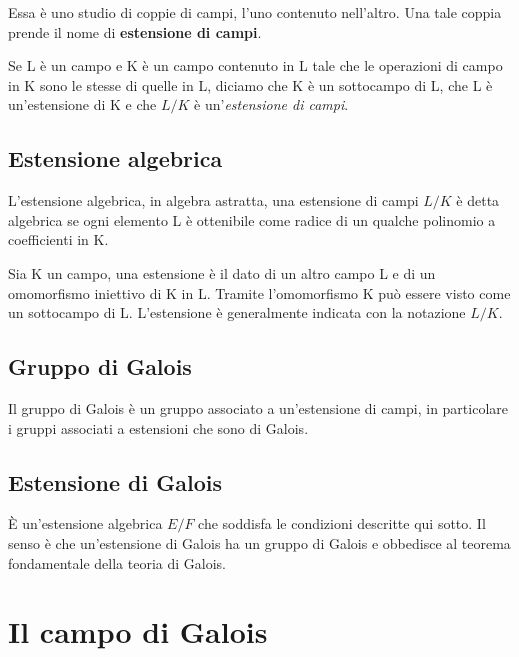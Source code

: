\textsf{\small Essa è uno studio di coppie di campi, l'uno contenuto nell'altro. Una tale coppia prende il nome di \textbf{estensione di campi}. }

\textsf{\small Se L è un campo e K è un campo contenuto in L tale che le operazioni di campo in K sono le stesse di quelle in L, diciamo che K è un sottocampo di L, che L è un'estensione di K e che $L/K$ è un'\emph{estensione di campi}.} %


\subsection{Estensione algebrica} %

\textsf{\small L'estensione algebrica, in algebra astratta, una estensione di campi $L/K$ è detta algebrica se ogni elemento L è ottenibile come radice di un qualche polinomio a coefficienti in K.}

\textsf{\small Sia K un campo, una estensione è il dato di un altro campo L e di un omomorfismo iniettivo di K in L. Tramite l'omomorfismo K può essere visto come un sottocampo di L. L'estensione è generalmente indicata con la notazione $L/K$.} %

\subsection{Gruppo di Galois}

\textsf{\small Il gruppo di Galois è un gruppo associato a un'estensione di campi, in particolare i gruppi associati a estensioni che sono di Galois.} %

\subsection{Estensione di Galois}

\textsf{\small È un'estensione algebrica $E/F$ che soddisfa le condizioni descritte qui sotto. Il senso è che un'estensione di Galois ha un gruppo di Galois e obbedisce al teorema fondamentale della teoria di Galois.} %


\section{Il campo di Galois} %

